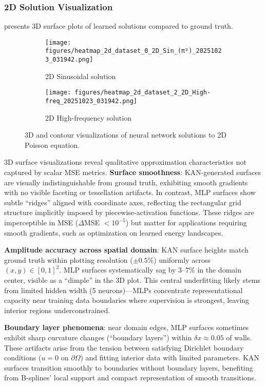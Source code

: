 \documentclass[11pt,a4paper]{article}
\begin{document}
\subsubsection{2D Solution Visualization}

 presents 3D surface plots of learned solutions compared to ground truth.

\begin{figure}[htbp]
\centering
\begin{subfigure}{0.48\textwidth}
\texttt{[image: figures/heatmap\_2d\_dataset\_0\_2D\_Sin\_(π²)\_20251023\_031942.png]}
\caption{2D Sinusoidal solution}
\end{subfigure}
\hfill
\begin{subfigure}{0.48\textwidth}
\texttt{[image: figures/heatmap\_2d\_dataset\_2\_2D\_High-freq\_20251023\_031942.png]}
\caption{2D High-frequency solution}
\end{subfigure}
\caption{3D and contour visualizations of neural network solutions to 2D Poisson equation.}
\label{fig:s13_surfaces}
\end{figure}

3D surface visualizations reveal qualitative approximation characteristics not captured by scalar MSE metrics. \textbf{Surface smoothness}: KAN-generated surfaces are visually indistinguishable from ground truth, exhibiting smooth gradients with no visible faceting or tessellation artifacts. In contrast, MLP surfaces show subtle ``ridges'' aligned with coordinate axes, reflecting the rectangular grid structure implicitly imposed by piecewise-activation functions. These ridges are imperceptible in MSE ($\Delta$MSE $< 10^{-5}$) but matter for applications requiring smooth gradients, such as optimization on learned energy landscapes.

\textbf{Amplitude accuracy across spatial domain}: KAN surface heights match ground truth within plotting resolution ($\pm 0.5\%$) uniformly across $(x,y) \in [0,1]^2$. MLP surfaces systematically sag by $3$--$7\%$ in the domain center, visible as a ``dimple'' in the 3D plot. This central underfitting likely stems from limited hidden width (5 neurons)—MLPs concentrate representational capacity near training data boundaries where supervision is strongest, leaving interior regions underconstrained.

\textbf{Boundary layer phenomena}: near domain edges, MLP surfaces sometimes exhibit sharp curvature changes (``boundary layers'') within $\delta x \approx 0.05$ of walls. These artifacts arise from the tension between satisfying Dirichlet boundary conditions ($u=0$ on $\partial\Omega$) and fitting interior data with limited parameters. KAN surfaces transition smoothly to boundaries without boundary layers, benefiting from B-splines' local support and compact representation of smooth transitions.
\end{document}
